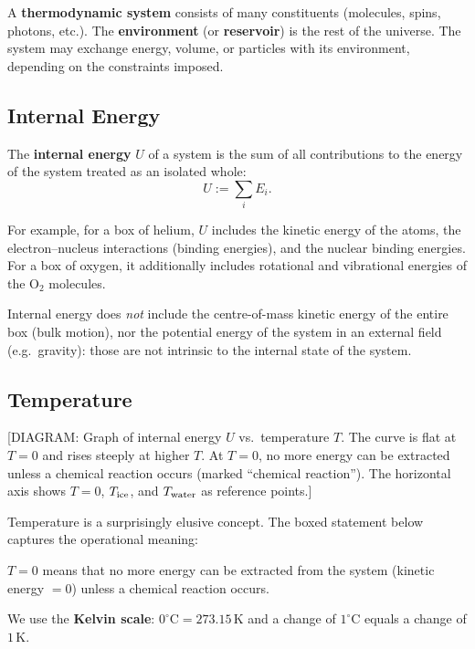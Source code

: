 A \textbf{thermodynamic system} consists of many constituents (molecules, spins, photons,
etc.). The \textbf{environment} (or \textbf{reservoir}) is the rest of the universe. The system
may exchange energy, volume, or particles with its environment, depending on the constraints
imposed.

\subsection{Internal Energy}

\begin{definition}
The \textbf{internal energy} $U$ of a system is the sum of all contributions to the energy of
the system treated as an isolated whole:
\[
  U := \sum_i E_i.
\]
\end{definition}

For example, for a box of helium, $U$ includes the kinetic energy of the atoms, the
electron--nucleus interactions (binding energies), and the nuclear binding energies. For a box
of oxygen, it additionally includes rotational and vibrational energies of the $\mathrm{O}_2$
molecules.

Internal energy does \emph{not} include the centre-of-mass kinetic energy of the entire box
(bulk motion), nor the potential energy of the system in an external field (e.g.\ gravity):
those are not intrinsic to the internal state of the system.

\subsection{Temperature}

\begin{center}
[DIAGRAM: Graph of internal energy $U$ vs.\ temperature $T$. The curve is flat at $T = 0$ and
rises steeply at higher $T$. At $T = 0$, no more energy can be extracted unless a chemical
reaction occurs (marked ``chemical reaction''). The horizontal axis shows $T = 0$, $T_{\rm ice}$,
and $T_{\rm water}$ as reference points.]
\end{center}

Temperature is a surprisingly elusive concept. The boxed statement below captures the
operational meaning:
\begin{fact}
$T = 0$ means that no more energy can be extracted from the system (kinetic energy $= 0$)
unless a chemical reaction occurs.
\end{fact}

We use the \textbf{Kelvin scale}: $0^\circ\mathrm{C} = 273.15\,\mathrm{K}$ and a change of
$1^\circ\mathrm{C}$ equals a change of $1\,\mathrm{K}$.

